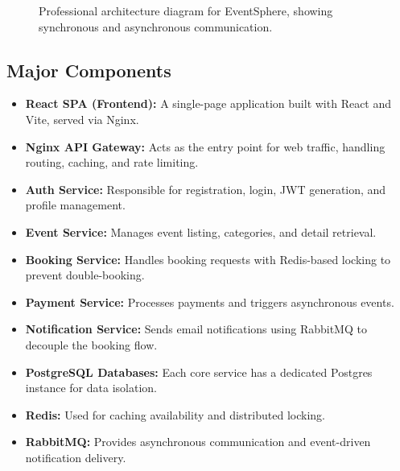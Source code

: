 \documentclass[12pt,a4paper]{article}
\begin{document}
\begin{figure}[H]
{%
    }
    \caption{Professional architecture diagram for EventSphere, showing synchronous and asynchronous communication.}
    \label{fig:architecture}
\end{figure}

\subsection{Major Components}
\begin{itemize}[itemsep=0.4em]
    \item \textbf{React SPA (Frontend):} A single-page application built with React and Vite, served via Nginx.
    \item \textbf{Nginx API Gateway:} Acts as the entry point for web traffic, handling routing, caching, and rate limiting.
    \item \textbf{Auth Service:} Responsible for registration, login, JWT generation, and profile management.
    \item \textbf{Event Service:} Manages event listing, categories, and detail retrieval.
    \item \textbf{Booking Service:} Handles booking requests with Redis-based locking to prevent double-booking.
    \item \textbf{Payment Service:} Processes payments and triggers asynchronous events.
    \item \textbf{Notification Service:} Sends email notifications using RabbitMQ to decouple the booking flow.
    \item \textbf{PostgreSQL Databases:} Each core service has a dedicated Postgres instance for data isolation.
    \item \textbf{Redis:} Used for caching availability and distributed locking.
    \item \textbf{RabbitMQ:} Provides asynchronous communication and event-driven notification delivery.
\end{itemize}
\end{document}
